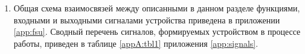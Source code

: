 \begin{enumerate}
\begin{itemize}
    \item погрешность выдержки времени -- не более 40 мс при выдержках менее 1,5 с и не более 2\% от уставки при выдержках времени выше 1,5 с.
\end{itemize}
Специфические требования к характеристикам функциональных блоков приведены в описаниях соответствующих функций в данном разделе.  
\item
Общая схема взаимосвязей между описанными в данном разделе функциями, входными и выходными сигналами устройства приведена в приложении \ref{app:fsu}.
Сводный перечень сигналов, формируемых устройством в процессе работы, приведен в таблице \ref{appA:tbl1} приложения \ref{app:signals}.

\end{enumerate}

